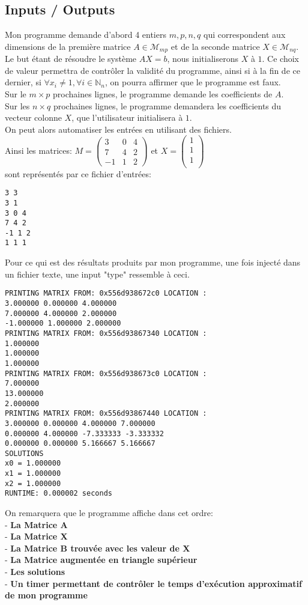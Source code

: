 \subsection{Inputs / Outputs}
Mon programme demande d'abord 4 entiers $m,p,n,q$ qui correspondent aux dimensions de la première matrice $A \in \mathcal{M}_{mp}$ et de la seconde matrice $X \in \mathcal{M}_{nq}$. Le but étant de résoudre le système $AX=b$, nous initialiserons $X$ à $1$. Ce choix de valeur permettra de contrôler la validité du programme, ainsi si à la fin de ce dernier, si $\forall x_i \neq 1, \forall i \in \mathbb{N}_{n}$, on pourra affirmer que le programme est faux.  \\
Sur le $m\times p$ prochaines lignes, le programme demande les coefficients de $A$. \\
Sur les $n \times q$ prochaines lignes, le programme demandera les coefficients du vecteur colonne $X$, que l'utilisateur initialisera à $1$. \\
On peut alors automatiser les entrées en utilisant des fichiers. \\
Ainsi les matrices:
$ M = \begin{pmatrix}
3 & 0 & 4\\
7 & 4 & 2 \\
-1 & 1 & 2
\end{pmatrix}
$
et 
$ X = \begin{pmatrix}
1 \\
1 \\
1 \\
\end{pmatrix}
$ \\
sont représentés par ce fichier d'entrées:
\begin{lstlisting}[caption=input.txt]
3 3
3 1 
3 0 4
7 4 2
-1 1 2
1 1 1
\end{lstlisting}
Pour ce qui est des résultats produits par mon programme, une fois injecté dans un fichier texte, une input "type" ressemble à ceci. \\
\begin{lstlisting}[caption=Gauss elimination with M and X matrix]
PRINTING MATRIX FROM: 0x556d938672c0 LOCATION :
3.000000 0.000000 4.000000
7.000000 4.000000 2.000000
-1.000000 1.000000 2.000000
PRINTING MATRIX FROM: 0x556d93867340 LOCATION :
1.000000
1.000000
1.000000
PRINTING MATRIX FROM: 0x556d938673c0 LOCATION :
7.000000
13.000000
2.000000
PRINTING MATRIX FROM: 0x556d93867440 LOCATION :
3.000000 0.000000 4.000000 7.000000
0.000000 4.000000 -7.333333 -3.333332
0.000000 0.000000 5.166667 5.166667
SOLUTIONS
x0 = 1.000000
x1 = 1.000000
x2 = 1.000000
RUNTIME: 0.000002 seconds 
\end{lstlisting}
On remarquera que le programme affiche dans cet ordre: \\
- \textbf{La Matrice A} \\
- \textbf{La Matrice X} \\
- \textbf{La Matrice B trouvée avec les valeur de X} \\
- \textbf{La Matrice augmentée en triangle supérieur} \\
- \textbf{Les solutions} \\
- \textbf{Un timer permettant de contrôler le temps d'exécution approximatif de mon programme} 
